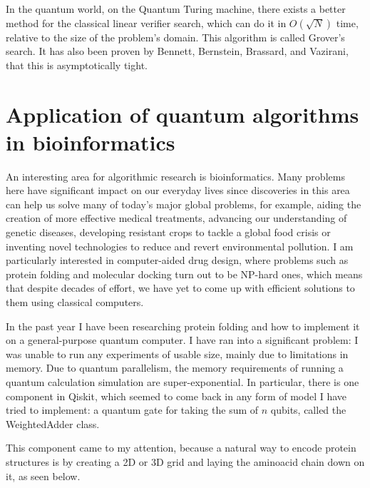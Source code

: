 In the quantum world, on the Quantum Turing machine, there exists a better method for the classical linear verifier search, which can do it in $O(\sqrt{N})$ time, relative to the size of the problem's domain. This algorithm is called Grover's search. It has also been proven by Bennett, Bernstein, Brassard, and Vazirani, that this is asymptotically tight\cite{bennett_strengths_1997}.

\section{Application of quantum algorithms in bioinformatics}

An interesting area for algorithmic research is bioinformatics. Many problems here have significant impact on our everyday lives since discoveries in this area can help us solve many of today’s major global problems, for example, aiding the creation of more effective medical treatments, advancing our understanding of genetic diseases, developing resistant crops to tackle a global food crisis or inventing novel technologies to reduce and revert environmental pollution. I am particularly interested in computer-aided drug design, where problems such as protein folding\cite{crescenzi_complexity_1998} and molecular docking\cite{a_molecular_2018} turn out to be NP-hard ones, which means that despite decades of effort, we have yet to come up with efficient solutions to them using classical computers.

In the past year I have been researching protein folding and how to implement it on a general-purpose quantum computer. I have ran into a significant problem: I was unable to run any experiments of usable size, mainly due to limitations in memory. Due to quantum parallelism, the memory requirements of running a quantum calculation simulation are super-exponential. In particular, there is one component in Qiskit, which seemed to come back in any form of model I have tried to implement: a quantum gate for taking the sum of $n$ qubits, called the WeightedAdder class. 

This component came to my attention, because a natural way to encode protein structures is by creating a 2D or 3D grid and laying the aminoacid chain down on it\cite{dill_principles_2008}, as seen below.

